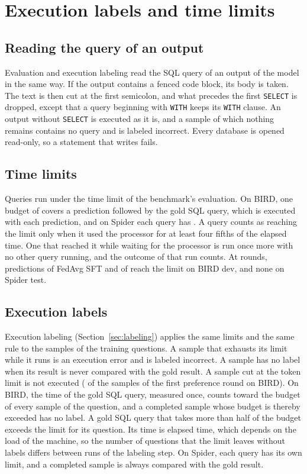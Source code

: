\section{Execution labels and time limits}\label{sup:labeling}

\subsection{Reading the query of an output}

Evaluation and execution
labeling read the SQL query of an output of the model in the same way.
If the output contains a fenced code block, its body is taken. The text
is then cut at the first semicolon, and what precedes the first
\texttt{SELECT} is dropped, except that a query beginning with
\texttt{WITH} keeps its \texttt{WITH} clause. An output without
\texttt{SELECT} is executed as it is, and a sample of which nothing
remains contains no query and is labeled incorrect. Every database is
opened read-only, so a statement that writes fails.

\subsection{Time limits}

Queries run under the time limit of the
benchmark's evaluation. On BIRD, one budget of 
covers a prediction followed by the gold SQL query, which is executed
with each prediction, and on Spider each query has
. A query counts as reaching the limit only when
it used the processor for at least four fifths of the elapsed time. One
that reached it while waiting for the processor is run once more with no
other query running, and the outcome of that run counts. At
 rounds,  predictions
of FedAvg SFT and  of \method{} reach the limit
on BIRD dev, and none on Spider test.

\subsection{Execution labels}

Execution labeling
(Section~\ref{sec:labeling}) applies the same limits and the same rule
to the samples of the training questions. A sample that exhausts its
limit while it runs is an execution error and is labeled incorrect. A
sample has no label when its result is never compared with the gold
result. A sample cut at the token limit is not executed
( of the
 samples of the first preference round on
BIRD). On BIRD, the time of the gold SQL query, measured once, counts
toward the budget of every sample of the question, and a completed
sample whose budget is thereby exceeded has no label. A gold SQL query
that takes more than half of the budget exceeds the limit for its
question. Its time is elapsed time, which depends on the load of the
machine, so the number of questions that the limit leaves without labels
differs between runs of the labeling step. On Spider, each query has its
own limit, and a completed sample is always compared with the gold
result.

